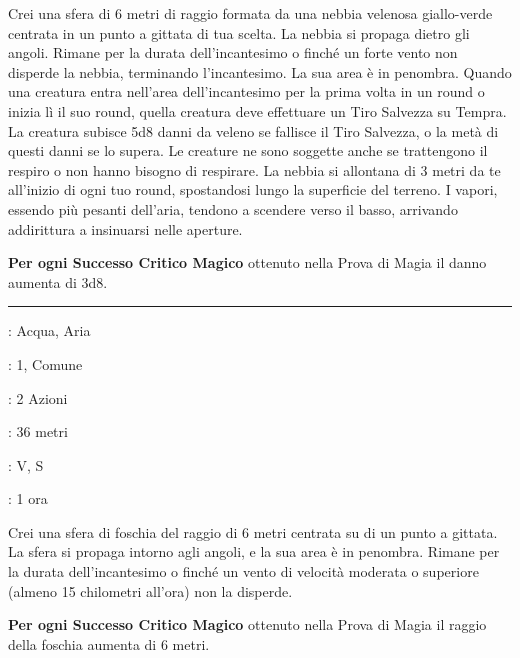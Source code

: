 \begin{multicols}{2}
Crei una sfera di 6 metri di raggio formata da una nebbia velenosa giallo-verde centrata in un punto a gittata di tua scelta. La nebbia si propaga dietro gli angoli. Rimane per la durata dell'incantesimo o finché un forte vento non disperde la nebbia, terminando l'incantesimo. La sua area è in penombra. Quando una creatura entra nell'area dell'incantesimo per la prima volta in un round o inizia lì il suo round, quella creatura deve effettuare un Tiro Salvezza su Tempra. La creatura subisce 5d8 danni da veleno se fallisce il Tiro Salvezza, o la metà di questi danni se lo supera. Le creature ne sono soggette anche se trattengono il respiro o non hanno bisogno di respirare. La nebbia si allontana di 3 metri da te all'inizio di ogni tuo round, spostandosi lungo la superficie del terreno. I vapori, essendo più pesanti dell'aria, tendono a scendere verso il basso, arrivando addirittura a insinuarsi nelle aperture.

\textbf{Per ogni Successo Critico Magico} ottenuto nella Prova di Magia il danno aumenta di 3d8.

\smallskip\noindent\rule{\linewidth}{2pt} \hypertarget{Nube di Nebbia}{}\medskip{}
\noindent
\begin{description}[noitemsep, topsep=0pt, parsep=0pt, partopsep=0pt, leftmargin=0cm, labelwidth=2.8cm]
	\item[\textbf{Lista di Magia}]: Acqua, Aria
	\item[\textbf{Livello}]: 1, Comune
	\item[\textbf{T. di Lancio}]: 2 Azioni
	\item[\textbf{Gittata}]: 36 metri
	\item[\textbf{Componenti}]: V, S
	\item[\textbf{Durata}]: 1 ora
\end{description}

Crei una sfera di foschia del raggio di 6 metri centrata su di un punto a gittata. La sfera si propaga intorno agli angoli, e la sua area è in penombra. Rimane per la durata dell'incantesimo o finché un vento di velocità moderata o superiore (almeno 15 chilometri all'ora) non la disperde.

\textbf{Per ogni Successo Critico Magico} ottenuto nella Prova di Magia il raggio della foschia aumenta di 6 metri.


\end{multicols}
